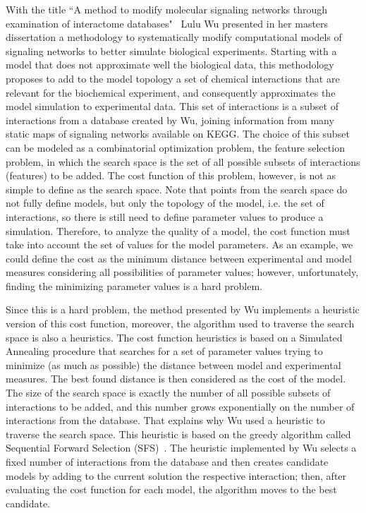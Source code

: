 With the title ``A method to modify molecular signaling networks through
examination of interactome databases"~\cite{Wu15} Lulu Wu presented in 
her masters dissertation a methodology to systematically modify 
computational models of signaling networks to better simulate biological 
experiments. Starting with a model that does not approximate well the 
biological data, this methodology proposes to add to the model topology 
a set of chemical interactions that are relevant for the biochemical 
experiment, and consequently approximates the model simulation to 
experimental data. This set of interactions is a subset of interactions 
from a database created by Wu, joining information from many static 
maps of signaling networks available on KEGG. The choice of this subset 
can be modeled as a combinatorial optimization problem, the feature 
selection problem, in which the search space is the set of all possible 
subsets of interactions (features) to be added. The cost function of 
this problem, however, is not as simple to define as the search space. 
Note that points from the search space do not fully define models, but 
only the topology of the model, i.e. the set of interactions, so there 
is still need to define parameter values to produce a simulation. 
Therefore, to analyze the quality of a model, the cost function must 
take into account the set of values for the model parameters. As an 
example, we could define the cost as the minimum distance between 
experimental and model measures considering all possibilities of 
parameter values; however, unfortunately, finding the minimizing 
parameter values is a hard problem.

Since this is a hard problem, the method presented by Wu 
implements a heuristic version of this cost function, moreover, the 
algorithm used to traverse the search space is also a heuristics. The 
cost function heuristics is based on a Simulated Annealing procedure 
that searches for a set of parameter values trying to minimize (as much 
as possible) the distance between model and experimental measures. The 
best found distance is then considered as the cost of the model. The 
size of the search space is exactly the number of all possible subsets
of interactions to be added, and this number grows exponentially on the 
number of interactions from the database. That explains why Wu used
a heuristic to traverse the search space. This heuristic is based on the 
greedy algorithm called Sequential Forward Selection 
(SFS)~\cite{Whitney1971}. The heuristic implemented by Wu selects a
fixed number of interactions from the database and then creates 
candidate models by adding to the current solution the respective 
interaction; then, after evaluating the cost function for each model, 
the algorithm moves to the best candidate.

